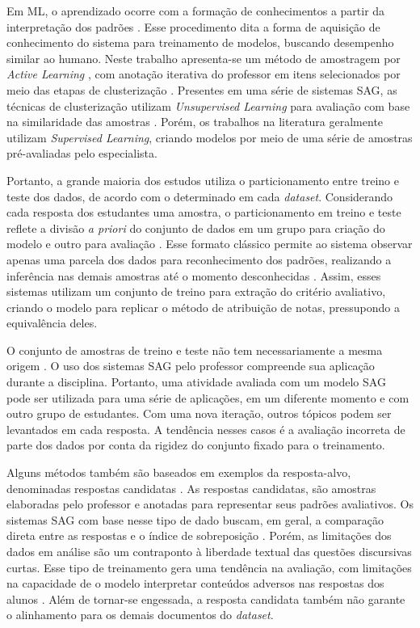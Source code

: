 Em ML, o aprendizado ocorre com a formação de conhecimentos a partir da interpretação dos padrões \cite{bishop2006}. Esse procedimento dita a forma de aquisição de conhecimento do sistema para treinamento de modelos, buscando desempenho similar ao humano. Neste trabalho apresenta-se um método de amostragem por \textit{Active Learning} \cite{miller2020, kumar2020}, com anotação iterativa do professor em itens selecionados por meio das etapas de clusterização \cite{horbach2018}. Presentes em uma série de sistemas SAG, as técnicas de clusterização utilizam \textit{Unsupervised Learning} para avaliação com base na similaridade das amostras \cite{basu2013, zhang2016, marvaniya2018}. Porém, os trabalhos na literatura geralmente utilizam \textit{Supervised Learning}, criando modelos por meio de uma série de amostras pré-avaliadas pelo especialista.

Portanto, a grande maioria dos estudos utiliza o particionamento entre treino e teste dos dados, de acordo com o determinado em cada \textit{dataset}. Considerando cada resposta dos estudantes uma amostra, o particionamento em treino e teste reflete a divisão \textit{a priori} do conjunto de dados em um grupo para criação do modelo e outro para avaliação \cite{heilman2015}. Esse formato clássico permite ao sistema observar apenas uma parcela dos dados para reconhecimento dos padrões, realizando a inferência nas demais amostras até o momento desconhecidas \cite{bishop2006}. Assim, esses sistemas utilizam um conjunto de treino para extração do critério avaliativo, criando o modelo para replicar o método de atribuição de notas, pressupondo a equivalência deles.

O conjunto de amostras de treino e teste não tem necessariamente a mesma origem \cite{sung2019a}. O uso dos sistemas SAG pelo professor compreende sua aplicação durante a disciplina. Portanto, uma atividade avaliada com um modelo SAG pode ser utilizada para uma série de aplicações, em um diferente momento e com outro grupo de estudantes. Com uma nova iteração, outros tópicos podem ser levantados em cada resposta. A tendência nesses casos é a avaliação incorreta de parte dos dados por conta da rigidez do conjunto fixado para o treinamento.

Alguns métodos também são baseados em exemplos da resposta-alvo, denominadas respostas candidatas \cite{banjade2015, roy2016}. As respostas candidatas, são amostras elaboradas pelo professor e anotadas para representar seus padrões avaliativos. Os sistemas SAG com base nesse tipo de dado buscam, em geral, a comparação direta entre as respostas e o índice de sobreposição \cite{jimenez2013, kar2017, zhang2020}. Porém, as limitações dos dados em análise são um contraponto à liberdade textual das questões discursivas curtas. Esse tipo de treinamento gera uma tendência na avaliação, com limitações na capacidade de o modelo interpretar conteúdos adversos nas respostas dos alunos \cite{ramachandran2015a}. Além de tornar-se engessada, a resposta candidata também não garante o alinhamento para os demais documentos do \textit{dataset}.

